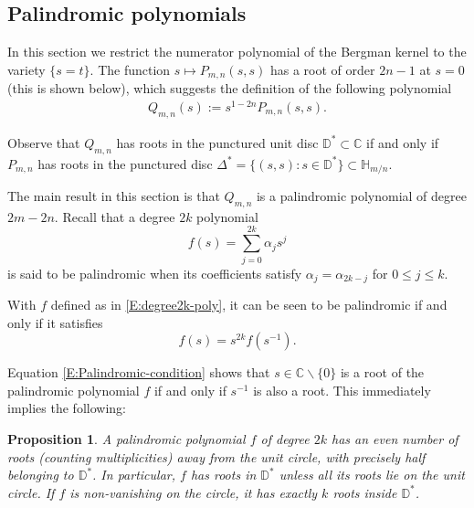 \documentclass[letterpaper,11pt,reqno]{amsart}
\theoremstyle{plain}
\newtheorem{proposition}[equation]{Proposition}
\theoremstyle{definition}
\theoremstyle{remark}
\theoremstyle{remark}
\numberwithin{equation}{section}
\newcommand{\C}{{\mathbb C}}
\newcommand{\D}{{\mathbb D}}
\newcommand{\h}{{\mathbb H}}
\begin{document}

\subsection{Palindromic polynomials}\label{SS:palindromic-polys}

In this section we restrict the numerator polynomial of the Bergman kernel to the variety $\{s = t\}$.
The function $s \mapsto P_{m,n}(s,s)$ has a root of order $2n-1$ at $s=0$ (this is shown below), which suggests the definition of the following polynomial
\begin{align}\label{E:def-of-Qmn}
Q_{m,n}(s) := s^{1-2n} P_{m,n}(s,s).
\end{align}

Observe that $Q_{m,n}$ has roots in the punctured unit disc $\D^* \subset \C$ if and only if $P_{m,n}$ has roots in the punctured disc $\Delta^* = \{(s,s): s \in \D^* \} \subset \h_{m/n}$.

The main result in this section is that $Q_{m,n}$ is a palindromic polynomial of degree $2m-2n$.
Recall that a degree $2k$ polynomial 
\begin{equation}\label{E:degree2k-poly}
f(s) = \sum_{j=0}^{2k} \alpha_j s^j
\end{equation}
is said to be palindromic when its coefficients satisfy $\alpha_j = \alpha_{2k-j}$ for $0\le j \le k$.

With $f$ defined as in \eqref{E:degree2k-poly}, it can be seen to be  palindromic if and only if it satisfies
\begin{equation}\label{E:Palindromic-condition}
f(s) = s^{2k} f(s^{-1}).
\end{equation}

Equation \eqref{E:Palindromic-condition} shows that $s \in \C\backslash \{0\}$ is a root of the palindromic polynomial $f$ if and only if $s^{-1}$ is also a root.
This immediately implies the following:


\begin{proposition}\label{P:Palindromic-roots}
A palindromic polynomial $f$ of degree $2k$ has an even number of roots (counting multiplicities) away from the unit circle, with precisely half belonging to $\D^*$.
In particular, $f$ has roots in $\D^*$ unless all its roots lie on the unit circle.
If $f$ is non-vanishing on the circle, it has exactly $k$ roots inside $\D^*$.
\end{proposition}
\end{document}
